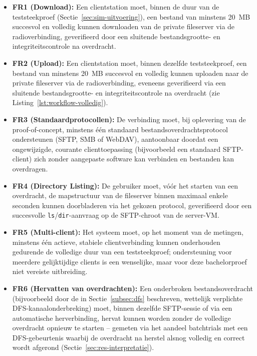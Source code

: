 \begin{itemize}
  \item \textbf{FR1 (Download):} Een clientstation moet, binnen de duur van de
        teststeekproef (Sectie~\ref{sec:sim-uitvoering}), een bestand van minstens
        20~MB succesvol en volledig kunnen downloaden van de private fileserver via de
        radioverbinding, geverifieerd door een sluitende bestandsgrootte- en
        integriteitscontrole na overdracht.
  \item \textbf{FR2 (Upload):} Een clientstation moet, binnen dezelfde teststeekproef,
        een bestand van minstens 20~MB succesvol en volledig kunnen uploaden naar de
        private fileserver via de radioverbinding, eveneens geverifieerd via een
        sluitende bestandsgrootte- en integriteitscontrole na overdracht (zie
        Listing~\ref{lst:workflow-volledig}).
  \item \textbf{FR3 (Standaardprotocollen):} De verbinding moet, bij oplevering van de
        proof-of-concept, minstens één standaard bestandsoverdrachtsprotocol
        ondersteunen (SFTP, SMB of WebDAV), aantoonbaar doordat een ongewijzigde,
        courante clienttoepassing (bijvoorbeeld een standaard SFTP-client) zich zonder
        aangepaste software kan verbinden en bestanden kan overdragen.
  \item \textbf{FR4 (Directory Listing):} De gebruiker moet, vóór het starten van een
        overdracht, de mapstructuur van de fileserver binnen maximaal enkele seconden
        kunnen doorbladeren via het gekozen protocol, geverifieerd door een succesvolle
        \texttt{ls}/\texttt{dir}-aanvraag op de SFTP-chroot van de server-VM.
  \item \textbf{FR5 (Multi-client):} Het systeem moet, op het moment van de metingen,
        minstens één actieve, stabiele clientverbinding kunnen onderhouden gedurende de
        volledige duur van een teststeekproef; ondersteuning voor meerdere
        gelijktijdige clients is een wenselijke, maar voor deze bachelorproef niet
        vereiste uitbreiding.
  \item \textbf{FR6 (Hervatten van overdrachten):} Een onderbroken bestandsoverdracht
        (bijvoorbeeld door de in Sectie~\ref{subsec:dfs} beschreven, wettelijk
        verplichte DFS-kanaalonderbreking) moet, binnen dezelfde SFTP-sessie of via een
        automatische herverbinding, hervat kunnen worden zonder de volledige overdracht
        opnieuw te starten -- gemeten via het aandeel batchtrials met een
        DFS-gebeurtenis waarbij de overdracht na herstel alsnog volledig en correct
        wordt afgerond (Sectie~\ref{sec:res-interpretatie}).
\end{itemize}

